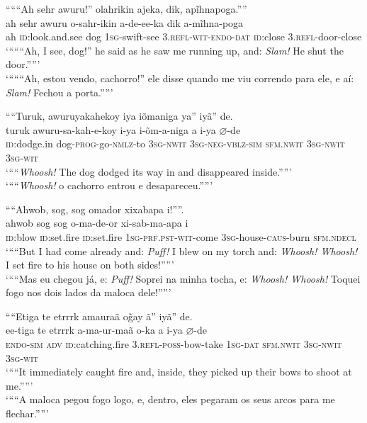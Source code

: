 \documentclass[output=paper,
modfonts,nonflat
]{langsci/langscibook}
\begin{document}
\ea “““Ah sehr awuru!” olahrikin ajeka, dik, apĩhnapoga.””\\[.3em]
\gll ah sehr awuru o-sahr-ikin a-de-ee-ka dik a-mĩhna-poga\\
ah \textsc{id}:look.and.see dog \textsc{1sg}-swift-see \textsc{3.refl-wit-endo-dat} \textsc{id}:close \textsc{3.refl}-door-close\\
\glt ‘“““Ah, I see, dog!” he said as he saw me running up, and: \textit{Slam!} He shut the door.””’\\
\glt ‘“““Ah, estou vendo, cachorro!” ele disse quando me viu correndo para ele, e aí: \textit{Slam!} Fechou a porta.””’\\
\z

\newpage 
\ea ““Turuk, awuruyakahekoy iya iõmaniga ya” iyã” de.\\[.3em]
\gll turuk awuru-sa-kah-e-koy i-ya i-õm-a-niga a i-ya \(\varnothing\)-de\\
\textsc{id}:dodge.in dog-\textsc{prog}-go-\textsc{nmlz}-to \textsc{3sg-nwit} \textsc{3sg-neg-vblz-sim} \textsc{sfm.nwit} \textsc{3sg-nwit} \textsc{3sg-wit}\\
\glt  ‘““\textit{Whoosh!} The dog dodged its way in and disappeared inside.””’\\
\glt  ‘““\textit{Whoosh!} o cachorro entrou e desapareceu.””’\\
\z

\ea ““Ahwob, sog, sog omador xixabapa i!””.\\[.3em]
\gll ahwob sog sog{\footnotemark} o-ma-de-or xi-sab-ma-apa i\\
\textsc{id}:blow \textsc{id}:set.fire \textsc{id}:set.fire \textsc{1sg-prf.pst-wit}-come \textsc{3sg}-house-\textsc{caus}-burn \textsc{sfm.ndecl}\\
\glt ‘““But I had come already and: \textit{Puff!} I blew on my torch and: \textit{Whoosh! Whoosh!} I set fire to his house on both sides!””’\\
\glt ‘““Mas eu chegou já, e: \textit{Puff!} Soprei na minha tocha, e: \textit{Whoosh! Whoosh!} Toquei fogo nos dois lados da maloca dele!””’\\
\z

\ea ““Etiga te etrrrk amauraã o\~{g}ay ã” iyã” de.\\[.3em]
\gll ee-tiga te etrrrk a-ma-ur-maã o-ka a i-ya \(\varnothing\)-de\\
\textsc{endo-sim} \textsc{adv} \textsc{id}:catching.fire \textsc{3.refl-poss}-bow-take \textsc{1sg-dat} \textsc{sfm.nwit} \textsc{3sg-nwit} \textsc{3sg-wit}\\
\glt ‘““It immediately caught fire and, inside, they picked up their bows to shoot at me.””’\\
\glt ‘““A maloca pegou fogo logo, e, dentro, eles pegaram os seus arcos para me flechar.””’\\
\z
\end{document}
